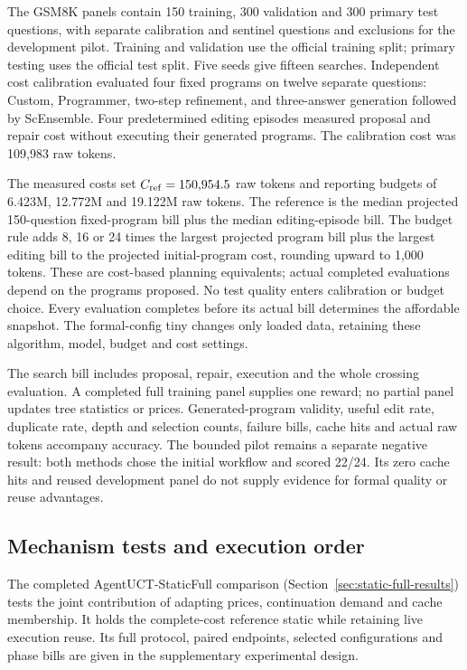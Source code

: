 The GSM8K panels contain 150 training, 300 validation and 300 primary test
questions, with separate calibration and sentinel questions and exclusions
for the development pilot. Training and validation use the official training
split; primary testing uses the official test split. Five seeds give fifteen
searches. Independent cost calibration evaluated four fixed programs on
twelve separate questions: Custom, Programmer, two-step refinement, and
three-answer generation followed by ScEnsemble. Four predetermined editing
episodes measured proposal and repair cost without executing their generated
programs. The calibration cost was 109,983 raw tokens.

The measured costs set $C_{\rm ref}=150{,}954.5$ raw tokens and reporting
budgets of 6.423M, 12.772M and 19.122M raw tokens. The reference is the median
projected 150-question fixed-program bill plus the median editing-episode
bill. The budget rule adds 8, 16 or 24 times the largest projected program
bill plus the largest editing bill to the projected initial-program cost,
rounding upward to 1,000 tokens. These are cost-based planning equivalents;
actual completed evaluations depend on the programs proposed. No test quality
enters calibration or budget choice. Every evaluation completes before its
actual bill determines the affordable snapshot. The formal-config tiny changes
only loaded data, retaining these algorithm, model, budget and cost settings.

The search bill includes proposal, repair, execution and the whole crossing
evaluation. A completed full training panel supplies one reward; no partial
panel updates tree statistics or prices. Generated-program validity, useful edit rate,
duplicate rate, depth and selection counts, failure bills, cache hits and
actual raw tokens accompany accuracy. The bounded pilot remains a separate
negative result: both methods chose the initial workflow and scored 22/24.
Its zero cache hits and reused development panel do not supply evidence for
formal quality or reuse advantages.

\subsection{Mechanism tests and execution order}
The completed AgentUCT-StaticFull comparison
(Section~\ref{sec:static-full-results}) tests the joint contribution of
adapting prices, continuation demand and cache membership. It holds the
complete-cost reference static while retaining live execution reuse.
Its full protocol, paired endpoints, selected configurations and phase
bills are given in the supplementary experimental design.

